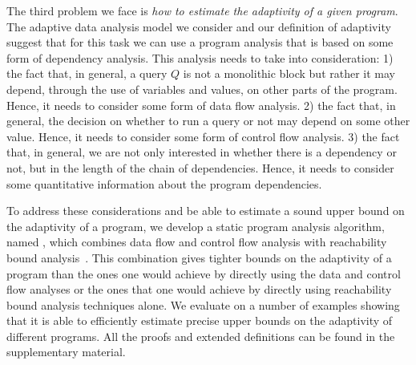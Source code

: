 
The third problem we face is \emph{how to estimate the adaptivity of a given program}. 
The adaptive data analysis model we consider and our definition of adaptivity suggest that for this task we can use a  program analysis that is based on some form of dependency analysis. This analysis needs to take into consideration:
1) the fact that, in general, a query $Q$ is not a monolithic block but rather it may depend, through the use of variables and values, on other parts of the program. Hence, it needs to consider some form of data flow analysis. 
2) the fact that, in general, the decision on whether to run a query or not may depend on some other value. Hence, 
 it needs to consider some form of control flow analysis.
 3) the fact that, in general, we are not only interested in whether there is a dependency or not, but in the length of the chain of dependencies. Hence, it needs to consider some quantitative information about the program dependencies. 
 
To address these considerations and be able to estimate a sound upper bound on the adaptivity of a program, 
we develop a static program analysis algorithm, named {\THESYSTEM}, which combines data flow and control flow analysis with reachability bound analysis~\cite{GulwaniZ10}. This combination gives tighter bounds on the adaptivity of a program than the ones one would achieve by directly using the data and control flow analyses or the ones that one would achieve by directly using reachability bound analysis techniques alone. We evaluate {\THESYSTEM} on a number of examples showing that it is able to efficiently estimate precise upper bounds on the adaptivity of different programs. 
All the proofs and extended definitions can be found in the supplementary material.

